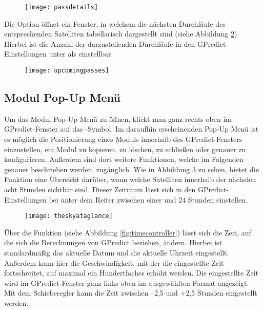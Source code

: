 \begin{figure}[h]
	\centering
	\texttt{[image: passdetails]}
	\caption{}
	\label{fig:passdetails} 
\end{figure}

\clearpage

Die Option  öffnet ein Fenster, in welchem die nächsten Durchläufe des entsprechenden Satelliten tabellarisch dargestellt sind (siehe Abbildung \ref{fig:upcomingpasses}). Hierbei ist die Anzahl der darzustellenden Durchläufe in den GPredict-Einstellungen unter  als  einstellbar.

\begin{figure}[h]
	\centering
	\texttt{[image: upcomingpasses]}
	\caption{}
	\label{fig:upcomingpasses} 
\end{figure}

\vspace{-0.5em}

\subsection{Modul Pop-Up Menü}

Um das Modul Pop-Up Menü zu öffnen, klickt man ganz rechts oben im GPredict-Fenster auf das \myvsymbol-Symbol. Im daraufhin erscheinenden Pop-Up Menü ist es möglich die Positionierung eines Moduls innerhalb des GPredict-Fensters einzustellen, ein Modul zu kopieren, zu löschen, zu schließen oder genauer zu konfigurieren. Außerdem sind dort weitere Funktionen, welche im Folgenden genauer beschrieben werden, zugänglich.\newpar
Wie in Abbildung \ref{fig:theskyataglance} zu sehen, bietet die Funktion  eine Übersicht darüber, wann welche Satelliten innerhalb der nächsten acht Stunden sichtbar sind. Dieser Zeitraum lässt sich in den GPredict-Einstellungen bei  unter dem Reiter  zwischen einer und 24 Stunden einstellen.

\begin{figure}[h]
	\centering
	\texttt{[image: theskyataglance]}
	\caption{}
	\label{fig:theskyataglance} 
\end{figure}

\clearpage

Über die Funktion  (siehe Abbildung \ref{fig:timecontroller}) lässt sich die Zeit, auf die sich die Berechnungen von GPredict beziehen, ändern. Hierbei ist standardmäßig das aktuelle Datum und die aktuelle Uhrzeit eingestellt. Außerdem kann hier die Geschwindigkeit, mit der die eingestellte Zeit fortschreitet, auf maximal ein Hundertfaches erhöht werden. Die eingestellte Zeit wird im GPredict-Fenster ganz links oben im ausgewählten Format angezeigt. Mit dem Schieberegler kann die Zeit zwischen --2,5 und +2,5 Stunden eingestellt werden.


